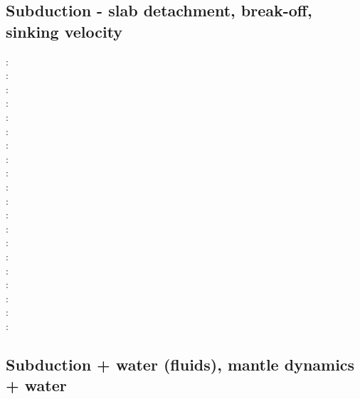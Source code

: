 \subsection{Subduction - slab detachment, break-off, sinking velocity}

\begin{scriptsize}
\nineteeneightyfive: \cite{futo85}\\
\nineteenninetytwo: \cite{wosp92}\\
\nineteenninetyfive: \cite{yowo95}\cite{voda95}\cite{davo95}\\
\nineteenninetyseven: \cite{wowo97}\\
\nineteenninetyeight: \cite{desw98}\cite{caws98}\\
\twothousand: \cite{wosp00}\\
\twothousandtwo: \cite{bugw02}\\
\twothousandfour: \cite{geym04}\\
\twothousandsix: \cite{fabm06}\\
\twothousandeight: \cite{zlfd08}\\
\twothousandnine: \cite{anbi09}\cite{bubi09}\cite{vasv09}\\
\twothousandten: \cite{bubi10}\cite{bagc10}\cite{hagr10}\\
\twothousandeleven: \cite{dugm11}\cite{vaal11}\cite{schm11}\\
\twothousandtwelve: \cite{dugk12}\cite{dusg12}\\
\twothousandthirteen: \cite{care13}\cite{mafv13}\cite{ghbu13}\cite{duge13}\cite{lixg13}\\
\twothousandfourteen: \cite{dugs14}\cite{besr14}\cite{vosd14}\cite{butm14}\\
\twothousandfifteen: \cite{vosc15}\cite{fohk15}\\
\twothousandseventeen: \cite{frbm17}\cite{maav17}\\
\twothousandeighteen: \cite{garm18}\cite{bezb18}\\
\twothousandnineteen: \cite{beml19}\cite{fegb19}
\end{scriptsize}

\subsection{Subduction + water (fluids), mantle dynamics + water}

